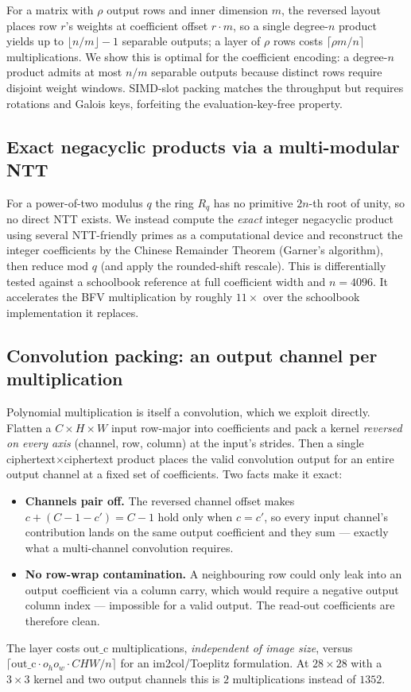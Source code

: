 \documentclass[11pt]{article}
\theoremstyle{plain}
\theoremstyle{definition}
\theoremstyle{remark}
\begin{document}
For a matrix with $\rho$ output rows and inner dimension $m$, the reversed
layout places row $r$'s weights at coefficient offset $r\cdot m$, so a single
degree-$n$ product yields up to $\lfloor n/m\rfloor - 1$ separable outputs; a
layer of $\rho$ rows costs $\lceil \rho m/n\rceil$ multiplications. We show
this is optimal for the coefficient encoding: a degree-$n$ product admits at
most $n/m$ separable outputs because distinct rows require disjoint weight
windows. SIMD-slot packing matches the throughput but requires rotations and
Galois keys, forfeiting the evaluation-key-free property.

\subsection{Exact negacyclic products via a multi-modular NTT}

For a power-of-two modulus $q$ the ring $R_q$ has no primitive $2n$-th root
of unity, so no direct NTT exists. We instead compute the \emph{exact}
integer negacyclic product using several NTT-friendly primes as a
computational device and reconstruct the integer coefficients by the Chinese
Remainder Theorem (Garner's algorithm), then reduce mod $q$ (and apply the
rounded-shift rescale). This is differentially tested against a schoolbook
reference at full coefficient width and $n=4096$. It accelerates the BFV
multiplication by roughly $11\times$ over the schoolbook implementation it
replaces.

\subsection{Convolution packing: an output channel per multiplication}

Polynomial multiplication is itself a convolution, which we exploit
directly. Flatten a $C\times H\times W$ input row-major into coefficients and
pack a kernel \emph{reversed on every axis} (channel, row, column) at the
input's strides. Then a single ciphertext$\times$ciphertext product places
the valid convolution output for an entire output channel at a fixed set of
coefficients. Two facts make it exact:
\begin{itemize}
\item \textbf{Channels pair off.} The reversed channel offset makes
$c + (C{-}1{-}c') = C{-}1$ hold only when $c=c'$, so every input channel's
contribution lands on the same output coefficient and they sum --- exactly
what a multi-channel convolution requires.
\item \textbf{No row-wrap contamination.} A neighbouring row could only leak
into an output coefficient via a column carry, which would require a
negative output column index --- impossible for a valid output. The read-out
coefficients are therefore clean.
\end{itemize}
The layer costs $\mathrm{out\_c}$ multiplications, \emph{independent of image
size}, versus $\lceil \mathrm{out\_c}\cdot o_h o_w\cdot CHW / n\rceil$ for an
im2col/Toeplitz formulation. At $28\times28$ with a $3\times3$ kernel and two
output channels this is $2$ multiplications instead of $1352$.
\end{document}
